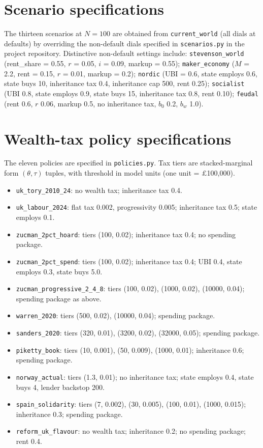 \documentclass[11pt]{article}
\begin{document}
\section{Scenario specifications}
\label{app:scenarios}

The thirteen scenarios at $N=100$ are obtained from
\texttt{current\_world} (all dials at defaults) by overriding the
non-default dials specified in \texttt{scenarios.py} in the project
repository. Distinctive non-default settings include:
\texttt{stevenson\_world} (rent\_share = 0.55, $r$ = 0.05, $i$ = 0.09,
markup = 0.55); \texttt{maker\_economy} ($M$ = 2.2, rent = 0.15,
$r$ = 0.01, markup = 0.2); \texttt{nordic} (UBI = 0.6, state employs
0.6, state buys 10, inheritance tax 0.4, inheritance cap 500, rent
0.25); \texttt{socialist} (UBI 0.8, state employs 0.9, state buys 15,
inheritance tax 0.8, rent 0.10); \texttt{feudal} (rent 0.6, $r$ 0.06,
markup 0.5, no inheritance tax, $b_0$ 0.2, $b_w$ 1.0).

\section{Wealth-tax policy specifications}
\label{app:policies}

The eleven policies are specified in \texttt{policies.py}. Tax tiers
are stacked-marginal form $(\theta, \tau)$ tuples, with threshold in
model units (one unit = $\pounds$100{,}000).

\begin{itemize}
\item \texttt{uk\_tory\_2010\_24}: no wealth tax; inheritance tax 0.4.
\item \texttt{uk\_labour\_2024}: flat tax 0.002, progressivity 0.005;
inheritance tax 0.5; state employs 0.1.
\item \texttt{zucman\_2pct\_hoard}: tiers (100, 0.02); inheritance
tax 0.4; no spending package.
\item \texttt{zucman\_2pct\_spend}: tiers (100, 0.02); inheritance
tax 0.4; UBI 0.4, state employs 0.3, state buys 5.0.
\item \texttt{zucman\_progressive\_2\_4\_8}: tiers (100, 0.02),
(1000, 0.02), (10000, 0.04); spending package as above.
\item \texttt{warren\_2020}: tiers (500, 0.02), (10000, 0.04);
spending package.
\item \texttt{sanders\_2020}: tiers (320, 0.01), (3200, 0.02),
(32000, 0.05); spending package.
\item \texttt{piketty\_book}: tiers (10, 0.001), (50, 0.009),
(1000, 0.01); inheritance 0.6; spending package.
\item \texttt{norway\_actual}: tiers (1.3, 0.01); no inheritance tax;
state employs 0.4, state buys 4, lender backstop 200.
\item \texttt{spain\_solidarity}: tiers (7, 0.002), (30, 0.005),
(100, 0.01), (1000, 0.015); inheritance 0.3; spending package.
\item \texttt{reform\_uk\_flavour}: no wealth tax; inheritance 0.2;
no spending package; rent 0.4.
\end{itemize}
\end{document}

